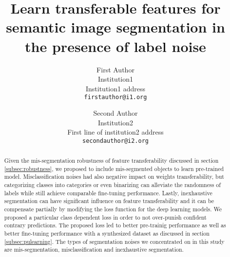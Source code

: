 \documentclass[10pt,twocolumn,letterpaper]{article}
\begin{document}
\onecolumn
{}


\twocolumn
{}
\newpage
\title{Learn transferable features for semantic image segmentation in the presence of label noise}

\author{First Author\\
Institution1\\
Institution1 address\\
{\tt\small firstauthor@i1.org}
\and
Second Author\\
Institution2\\
First line of institution2 address\\
{\tt\small secondauthor@i2.org}
}

\maketitle


\begin{abstract}
Given the mis-segmentation robustness of feature transferability discussed in section \ref{subsec:robustness}, we proposed to include mis-segmented objects to learn pre-trained model.
Misclassification noises had also negative impact on weights transferability, but categorizing classes into categories or even binarizing can alleviate the randomness of labels while still achieve comparable fine-tuning performance.
Lastly, inexhaustive segmentation can have significant influence on feature transferability and it can be compensate partially by modifying the loss function for the deep learning models.
We proposed a particular class dependent loss in order to not over-punish confident contrary predictions.
The proposed loss led to better pre-trainig performance as well as better fine-tuning performance with a synthesized dataset as discussed in section \ref{subsec:pulearning}.
The types of segmentation noises we concentrated on in this study are mis-segmentation, misclassification and inexhaustive segmentation.

\end{abstract}


















{\small


}


\end{document}
